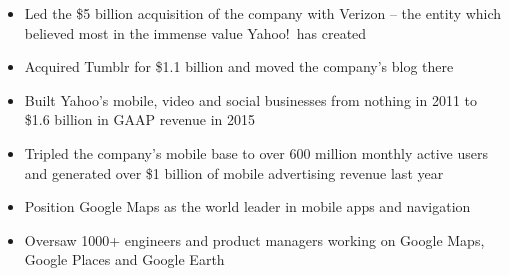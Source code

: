 \documentclass[10pt,letterpaper]{paws}
\begin{document}

\begin{fullwidth}
\makecvheader
\end{fullwidth}



\begin{itemize}
\item Led the \$5 billion acquisition of the company with Verizon -- the entity which believed most in the immense value Yahoo!\ has created
\item Acquired Tumblr for \$1.1 billion and moved the company's blog there
\item Built Yahoo's mobile, video and social businesses from nothing in 2011 to \$1.6 billion in GAAP revenue in 2015
\item Tripled the company's mobile base to over 600 million monthly active users and generated over \$1 billion of mobile advertising revenue last year
\end{itemize}

\divider

\begin{itemize}
\item Position Google Maps as the world leader in mobile apps and navigation
\item Oversaw 1000+ engineers and product managers working on Google Maps, Google Places and Google Earth
\end{itemize}
\end{document}
